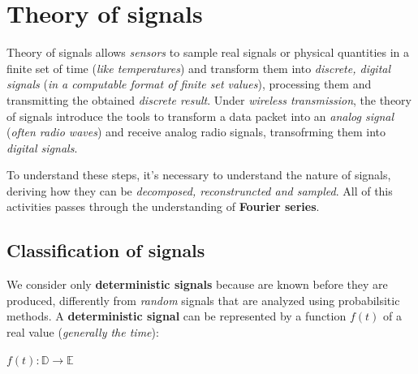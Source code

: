 \documentclass[10pt,a4paper]{report}
\theoremstyle{definition}
\begin{document}
\chapter{Theory of signals}\label{sec:theory-of-signals}
Theory of signals allows \textit{sensors} to sample real signals or physical quantities in a finite set of time (\textit{like temperatures}) and transform them into \textit{discrete, digital signals} (\textit{in a computable format of finite set values}), processing them and transmitting the obtained \textit{discrete result}.
Under \textit{wireless transmission}, the theory of signals introduce the tools to transform a data packet into an \textit{analog signal} (\textit{often radio waves}) and receive analog radio signals, transofrming them into \textit{digital signals}.

To understand these steps, it's necessary to understand the nature of signals, deriving how they can be \textit{decomposed, reconstruncted and sampled}. All of this activities passes through the understanding of \textbf{Fourier series}.
\section{Classification of signals}\label{sec:classification-of-signals}
We consider only \textbf{deterministic signals} because are known before they are produced, differently from \textit{random} signals that are analyzed using probabilsitic methods.
A \textbf{deterministic signal} can be represented by a function $f(t)$ of a real value (\textit{generally the time}):
\begin{center}
	$f(t): \mathbb{D} \rightarrow \mathbb{E}$
\end{center}
\end{document}
